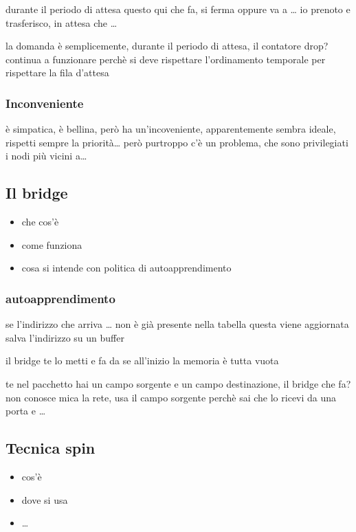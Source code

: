 \documentclass[11pt]{article}
\begin{document}
durante il periodo di attesa questo qui che fa, si ferma oppure va a \ldots{}   
io prenoto e trasferisco, in attesa che \ldots{}

la domanda è semplicemente, durante il periodo di attesa, il contatore drop?
continua a funzionare perchè si deve rispettare l'ordinamento temporale per rispettare la fila d'attesa

\subsubsection{Inconveniente}
\label{sec:orgee7b4b5}
è simpatica, è bellina, però ha un'incoveniente, apparentemente sembra ideale, rispetti sempre la priorità\ldots{}
però purtroppo c'è un problema, che sono privilegiati i nodi più vicini a\ldots{}

\subsection{Il bridge}
\label{sec:orgcbcc51a}
\begin{itemize}
\item che cos'è
\item come funziona
\item cosa si intende con politica di autoapprendimento
\end{itemize}

\subsubsection{autoapprendimento}
\label{sec:orgeb0a817}
se l'indirizzo che arriva \ldots{} non è già presente nella tabella questa viene aggiornata
salva l'indirizzo su un buffer

il bridge te lo metti e fa da se
all'inizio la memoria è tutta vuota

te nel pacchetto hai un campo sorgente e un campo destinazione, il bridge che fa? non conosce mica la rete, usa il campo sorgente perchè sai che lo ricevi da una porta e \ldots{}

\subsection{Tecnica spin}
\label{sec:org70444d3}
\begin{itemize}
\item cos'è
\item dove si usa
\item \ldots{}
\end{itemize}
\end{document}

